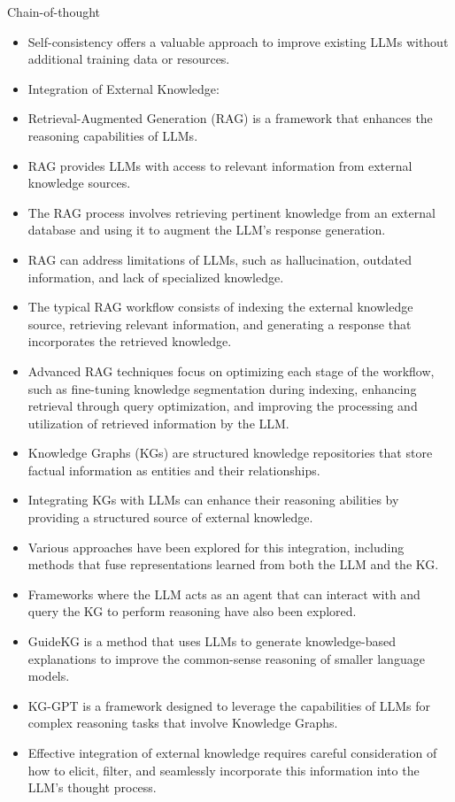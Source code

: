 \begin{frame}[allowframebreaks]{Chain-of-thought}
\begin{itemize}
	\item Self-consistency offers a valuable approach to improve existing LLMs without additional training data or resources.
	\item Integration of External Knowledge:
	\item Retrieval-Augmented Generation (RAG) is a framework that enhances the reasoning capabilities of LLMs.
	\item RAG provides LLMs with access to relevant information from external knowledge sources.
	\item The RAG process involves retrieving pertinent knowledge from an external database and using it to augment the LLM’s response generation.
	\item RAG can address limitations of LLMs, such as hallucination, outdated information, and lack of specialized knowledge.
	\item The typical RAG workflow consists of indexing the external knowledge source, retrieving relevant information, and generating a response that incorporates the retrieved knowledge.
	\item Advanced RAG techniques focus on optimizing each stage of the workflow, such as fine-tuning knowledge segmentation during indexing, enhancing retrieval through query optimization, and improving the processing and utilization of retrieved information by the LLM.
	\item Knowledge Graphs (KGs) are structured knowledge repositories that store factual information as entities and their relationships.
	\item Integrating KGs with LLMs can enhance their reasoning abilities by providing a structured source of external knowledge.
	\item Various approaches have been explored for this integration, including methods that fuse representations learned from both the LLM and the KG.
	\item Frameworks where the LLM acts as an agent that can interact with and query the KG to perform reasoning have also been explored.
	\item GuideKG is a method that uses LLMs to generate knowledge-based explanations to improve the common-sense reasoning of smaller language models.
	\item KG-GPT is a framework designed to leverage the capabilities of LLMs for complex reasoning tasks that involve Knowledge Graphs.
	\item Effective integration of external knowledge requires careful consideration of how to elicit, filter, and seamlessly incorporate this information into the LLM’s thought process.

\end{itemize}
\end{frame}
